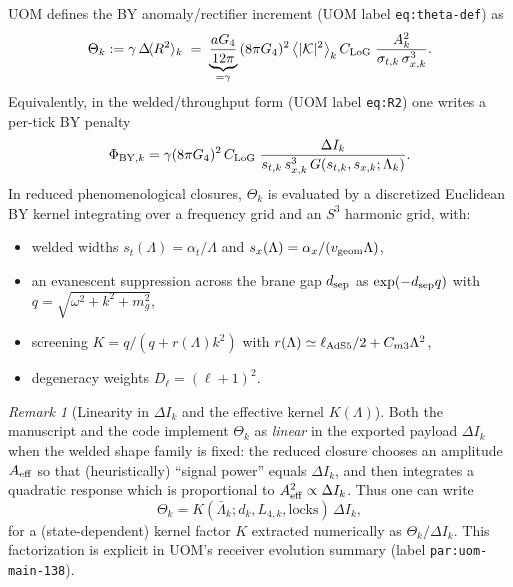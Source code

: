 \documentclass[11pt]{article}
\theoremstyle{definition}
\theoremstyle{plain}
\theoremstyle{remark}
\newtheorem{remark}[definition]{Remark}
\newcommand{\cK}{\mathcal K}
\begin{document}
UOM defines the BY anomaly/rectifier increment (UOM label \texttt{eq:theta-def}) as
\begin{equation}
\Theta_k
:=\gamma\,\Delta\!\langle R^2\rangle_k
\;=\;\underbrace{\frac{aG_4}{12\pi}}_{=\gamma}\,(8\pi G_4)^2\,
\big\langle|\cK|^2\big\rangle_k\,
C_{\rm LoG}\;\frac{A_k^2}{\sigma_{t,k}\,\sigma_{x,k}^3}.
\label{eq:theta-def-note}
\end{equation}
Equivalently, in the welded/throughput form (UOM label \texttt{eq:R2}) one writes a per-tick BY penalty
\begin{equation}
\Phi_{{\rm BY},k}
=
\gamma(8\pi G_4)^2\,C_{\rm LoG}\;
\frac{\Delta I_k}{s_{t,k}\,s_{x,k}^{3}\,G(s_{t,k},s_{x,k};\Lambda_k)}.
\label{eq:by-throughput-note}
\end{equation}
In reduced phenomenological closures, $\Theta_k$ is evaluated by a discretized Euclidean BY kernel integrating over a
frequency grid and an $S^3$ harmonic grid, with:
\begin{itemize}[leftmargin=1.6em]
\item welded widths $s_t(\Lambda)=\alpha_t/\Lambda$ and $s_x(\Lambda)=\alpha_x/(v_{\rm geom}\Lambda)$,
\item an evanescent suppression across the brane gap $d_{\rm sep}$ as $\exp(-d_{\rm sep}q)$ with
$q=\sqrt{\omega^2+k^2+m_g^2}$,
\item screening $K=q/(q+r(\Lambda)k^2)$ with $r(\Lambda)\simeq \ell_{\rm AdS5}/2 + C_{m3}\Lambda^2$,
\item degeneracy weights $D_\ell=(\ell+1)^2$.
\end{itemize}
\begin{remark}[Linearity in $\Delta I_k$ and the effective kernel $K(\Lambda)$]
Both the manuscript and the code implement $\Theta_k$ as \emph{linear} in the exported payload $\Delta I_k$ when the welded
shape family is fixed: the reduced closure chooses an amplitude $A_{\rm eff}$ so that (heuristically) ``signal power'' equals
$\Delta I_k$, and then integrates a quadratic response which is proportional to $A_{\rm eff}^2\propto \Delta I_k$.
Thus one can write
\begin{equation}
\Theta_k = K(\bar\Lambda_k;d_k,L_{4,k},\text{locks})\,\Delta I_k,
\label{eq:theta-factorization}
\end{equation}
for a (state-dependent) kernel factor $K$ extracted numerically as $\Theta_k/\Delta I_k$.
This factorization is explicit in UOM's receiver evolution summary (label \texttt{par:uom-main-138}).
\end{remark}
\end{document}
